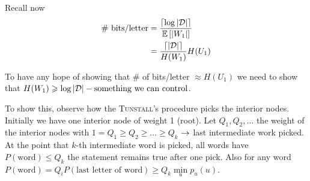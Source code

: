 Recall now 
\[
    \begin{aligned}
        \text{\# bits/letter} &= \frac{ \left\lceil \log\left\lvert\mathcal{D}\right\rvert \right\rceil}{\mathbb{E}\left[ \left\lvert W_1\right\rvert \right]}\\
        &= \frac{\left\lceil \left\lvert\mathcal{D}\right\rvert \right\rceil}{H(W_1)} H(U_1)
    \end{aligned}
\]

To have any hope of showing that \# of bits/letter $\approx H(U_1)$ we need to show that $H(W_1) \geqslant \log \left\lvert\mathcal{D}\right\rvert - \text{something we can control}$.

To show this, observe how the \textsc{Tunstall}'s procedure picks the interior nodes. Initially we have one interior node of weight 1 (root). Let $Q_1,Q_2,\ldots$ the weight of the interior nodes with $1=Q_1 \geqslant Q_2 \geqslant \ldots \geqslant Q_k$ $\rightarrow$ last intermediate work picked. At the point that $k$-th intermediate word is picked, all words have $P(\text{word}) \leqslant Q_k$ the statement remains true after one pick. Also for any word $P(\text{word}) = Q_i P(\text{last letter of word}) \geqslant Q_k \min\limits_up_u(u)$.